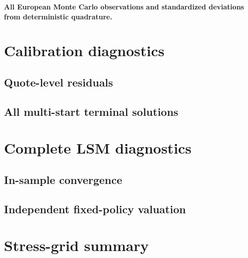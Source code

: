 \documentclass[11pt]{article}
\numberwithin{equation}{section}
\theoremstyle{definition}
\theoremstyle{remark}
\begin{document}
\begin{center}
  \small\textbf{All European Monte Carlo observations and standardized
  deviations from deterministic quadrature.}\par\medskip
  \scriptsize
  
\end{center}

\section{Calibration diagnostics}
\label{app:calibration-tables}

\subsection{Quote-level residuals}
\begin{center}
  \scriptsize
  
\end{center}

\subsection{All multi-start terminal solutions}
\begin{center}
  \scriptsize
  \resizebox{\linewidth}{!}{}
\end{center}

\section{Complete LSM diagnostics}
\label{app:lsm}

\subsection{In-sample convergence}
\begin{center}
  \scriptsize
  
\end{center}

\subsection{Independent fixed-policy valuation}
\begin{center}
  \scriptsize
  \resizebox{\linewidth}{!}{}
\end{center}

\section{Stress-grid summary}
\label{app:stress-table}
\end{document}
